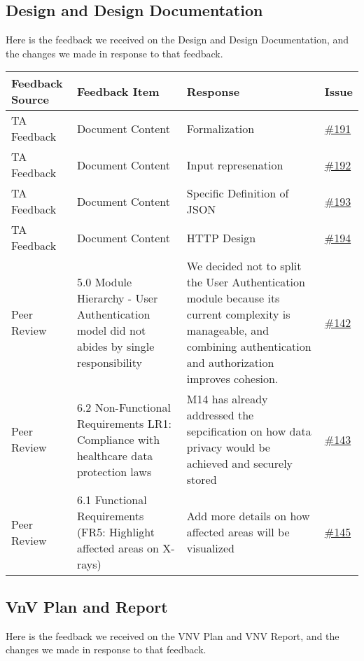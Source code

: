\documentclass{article}
\begin{document}
\subsection{Design and Design Documentation}

Here is the feedback we received on the Design and Design Documentation, and the changes we made in response to that feedback.
\begin{longtable}{| p{} | p{} | p{} | p{} |}
\hline
\textbf{Feedback Source} & \textbf{Feedback Item} & \textbf{Response} & \textbf{Issue} \\
\hline
TA Feedback & Document Content & Formalization  & \href{https://github.com/RezaJodeiri/CXR-Capstone/issues/191}{\#191} \\
\hline
TA Feedback & Document Content & Input represenation & \href{https://github.com/RezaJodeiri/CXR-Capstone/issues/192}{\#192} \\
\hline
TA Feedback & Document Content & Specific Definition of JSON & \href{https://github.com/RezaJodeiri/CXR-Capstone/issues/193}{\#193} \\
\hline
TA Feedback & Document Content & HTTP Design & \href{https://github.com/RezaJodeiri/CXR-Capstone/issues/194}{\#194} \\
\hline
Peer Review & 5.0 Module Hierarchy - User Authentication model did not abides by single responsibility & We decided not to split the User Authentication module because its current complexity is manageable, and combining authentication and authorization improves cohesion. &\href{https://github.com/RezaJodeiri/CXR-Capstone/issues/142}{\#142}\\
\hline
Peer Review & 6.2 Non-Functional Requirements LR1: Compliance with healthcare data protection laws & M14 has already addressed the sepcification on how data privacy would be achieved and securely stored & \href{https://github.com/RezaJodeiri/CXR-Capstone/issues/143}{\#143}\\
\hline
Peer Review & 6.1 Functional Requirements (FR5: Highlight affected areas on X-rays) & Add more details on how affected areas will be visualized & \href{https://github.com/RezaJodeiri/CXR-Capstone/issues/145}{\#145}
\hline
\end{longtable}
\subsection{VnV Plan and Report}

Here is the feedback we received on the VNV Plan and VNV  Report, and the changes we made in response to that feedback.
\end{document}
